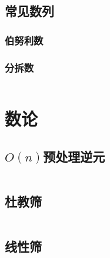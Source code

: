 \documentclass[a4paper]{article}
\begin{document}
\begin{multicols}{2}




			
				
			\subsection{常见数列}
				\subsubsection{伯努利数}
					
				
				\subsubsection{分拆数}
					\inputminted{cpp}{../src/math/分拆数.cpp}


		\section{数论}

			\subsection{$O(n)$预处理逆元}
				\inputminted{cpp}{../src/numbertheory/O(n)求逆元.cpp}

			\subsection{杜教筛}
				\inputminted{cpp}{../src/numbertheory/杜教筛.cpp}
			
			\subsection{线性筛}
				\inputminted{cpp}{../src/numbertheory/扩展线性筛.cpp}


\end{multicols}
\end{document}
